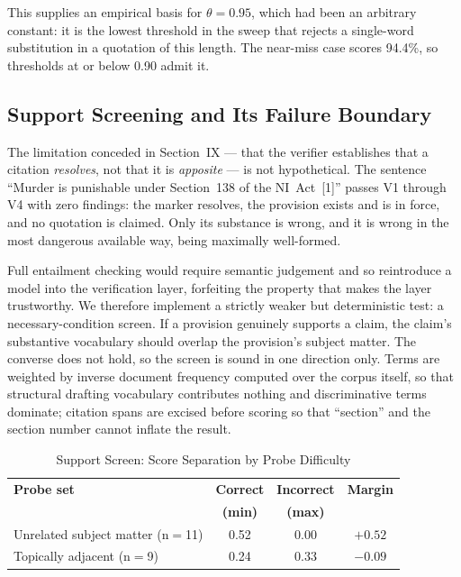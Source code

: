 \documentclass[conference]{IEEEtran}
\begin{document}
This supplies an empirical basis for $\theta = 0.95$, which had been an
arbitrary constant: it is the lowest threshold in the sweep that rejects a
single-word substitution in a quotation of this length. The near-miss case
scores 94.4\%, so thresholds at or below 0.90 admit it.

\subsection{Support Screening and Its Failure Boundary}
\label{ssec:support}

The limitation conceded in Section~IX --- that the verifier establishes that a
citation \emph{resolves}, not that it is \emph{apposite} --- is not hypothetical.
The sentence ``Murder is punishable under Section~138 of the NI~Act~[1]'' passes
V1 through V4 with zero findings: the marker resolves, the provision exists and
is in force, and no quotation is claimed. Only its substance is wrong, and it is
wrong in the most dangerous available way, being maximally well-formed.

Full entailment checking would require semantic judgement and so reintroduce a
model into the verification layer, forfeiting the property that makes the layer
trustworthy. We therefore implement a strictly weaker but deterministic test: a
necessary-condition screen. If a provision genuinely supports a claim, the
claim's substantive vocabulary should overlap the provision's subject matter.
The converse does not hold, so the screen is sound in one direction only. Terms
are weighted by inverse document frequency computed over the corpus itself, so
that structural drafting vocabulary contributes nothing and discriminative terms
dominate; citation spans are excised before scoring so that ``section'' and the
section number cannot inflate the result.

\begin{table}[t]
\caption{Support Screen: Score Separation by Probe Difficulty}
\label{tab:support}
\centering
\footnotesize
\begin{tabular}{@{}lccc@{}}
\toprule
\textbf{Probe set} & \textbf{Correct} & \textbf{Incorrect} & \textbf{Margin} \\
                   & \textbf{(min)}   & \textbf{(max)}     & \\
\midrule
Unrelated subject matter (n$=$11) & 0.52 & 0.00 & $+0.52$ \\
Topically adjacent (n$=$9)        & 0.24 & 0.33 & $\mathbf{-0.09}$ \\
\bottomrule
\end{tabular}
\end{table}
\end{document}
